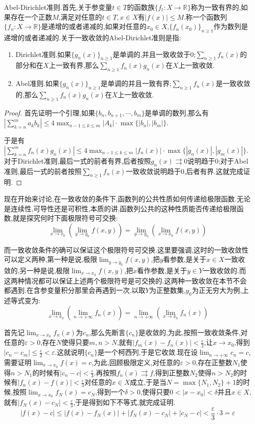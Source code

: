 Abel-Dirichlet准则.首先,关于参变量$t\in T$的函数族$\{f_t:X\to\mathbb{R}\}$称为一致有界的,如果存在一个正数$M$,满足对任意的$t\in T,x\in X$有$|f(x)|\le M$.称一个函数列$\{f_n:X\to\mathbb{R}\}$是递增的或者递减的,如果对任意的$x_0\in X$,$\{f_n(x_0)\}_{n\ge1}$作为数列是递增的或者递减的.关于一致收敛的Abel-Dirichlet准则是指:
\begin{enumerate}
	\item Dirichlet准则.如果$\{g_n(x)\}_{n\ge1}$是单调的,并且一致收敛于0;$\sum_{n\ge1}f_n(x)$的部分和在$X$上一致有界,那么$\sum_{n\ge1}f_n(x)g_n(x)$在$X$上一致收敛.
	\item Abel准则.如果$\{g_n(x)\}_{n\ge1}$是单调的并且一致有界;$\sum_{n\ge1}f_n(x)$是一致收敛的,那么$\sum_{n\ge1}f_n(x)g_n(x)$在$X$上一致收敛.
\end{enumerate}
\begin{proof}
	
	首先证明一个引理,如果$\{b_n,b_{n+1},\cdots,b_m\}$是单调的数列,那么有$\left|\sum_{k=n}^ma_kb_k\right|\le 4\max_{n-1\le k\le m}|A_k|\cdot\max\{|b_n|,|b_m|\}$.
	
	于是有$\left|\sum_{k=n}^mf_n(x)g_n(x)\right|\le 4\max_{n-1\le k\le m}|f_n(x)|\cdot\max\{|g_n(x)|,|g_m(x)|\}$.对于Dirichlet准则,最后一式的前者有界,后者按照$g_n(x)\rightrightarrows0$说明趋于0;对于Abel准则,最后一式的前者按照$\sum_{n\ge1}f_n(x)$一致收敛说明趋于0,后者有界.这就完成证明.
	
\end{proof}

现在开始来讨论,在一致收敛的条件下,函数列的公共性质如何传递给极限函数.无论是连续性,可导性还是可积性,本质的讲,函数列公共的这种性质能否传递给极限函数,就是探究何时下面极限符号可交换:
$$\lim_{x\to x_0}\left(\lim_{y\to y_0}f(x,y)\right)=\lim_{y\to y_0}\left(\lim_{x\to x_0}f(x,y)\right)$$

而一致收敛条件的确可以保证这个极限符号可交换.这里要强调,这时的一致收敛性可以定义两种,第一种是说,极限$\lim_{y\to y_0}f(x,y)$,把$y$看参数,是关于$x\in X$一致收敛的,另一种是说,极限$\lim_{x\to x_0}f(x,y)$,把$x$看作参数,是关于$y\in Y$一致收敛的.而这两种情况都可以保证上述两个极限符号是可交换的.这两种一致收敛在本节不会都遇到.在含参变量积分那里会再遇到一次.以取$Y$为正整数集,$y_0$为正无穷大为例,上述等式变为:
$$\lim_{x\to x_0}\left(\lim_{n\to+\infty}f_n(x)\right)=\lim_{n\to +\infty}\left(\lim_{x\to x_0}f_n(x)\right)$$

首先记$\lim_{x\to x_0}f_n(x)$为$c_n$,那么先断言$\{c_n\}$是收敛的,为此,按照一致收敛条件,对任意的$\varepsilon>0$,存在$N$使得只要$m,n>N$,就有$|f_m(x)-f_n(x)|<\frac{\varepsilon}{2}$,让$x\to x_0$,得到$|c_n-c_m|\le\frac{\varepsilon}{2}<\varepsilon$.这就说明$\{c_n\}$是一个柯西列,于是它收敛.现在设$\lim_{n\to+\infty}c_n=c$,需要证明$\lim_{x\to x_0}f(x)=c$,为此,回顾极限定义,对任意的$\varepsilon>0$,存在正整数$N_1$使得$n>N_1$的时候有$|c_n-c|<\frac{\varepsilon}{3}$.再按照$f_n(x)\rightrightarrows f$,得到正整数$N_2$使得$n>N_2$的时候有$|f_n(x)-f(x)|<\frac{\varepsilon}{3}$对任意的$x\in X$成立,于是当$N=\max\{N_1,N_2\}+1$的时候,按照$\lim_{x\to x_0}f_N(x)=c_N$,得到一个$\delta>0$,使得只要$0<|x-x_0|<\delta$并且$x\in X$,就有$|f_N(x)-c_N|<\frac{\varepsilon}{3}$,于是得到如下不等式,就完成证明.
$$|f(x)-c|\le|f(x)-f_N(x)|+|f_N(x)-c_N|+|c_N-c|<\frac{\varepsilon}{3}\cdot3=\varepsilon$$

